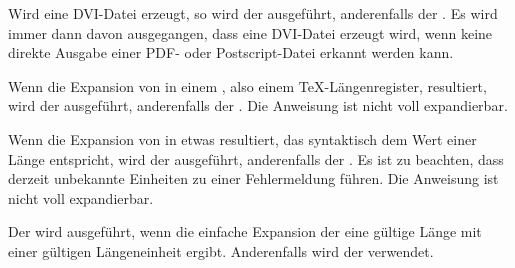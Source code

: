 \begin{Declaration}[0]
\end{Declaration}
Wird eine DVI-Datei erzeugt, so wird der
 ausgeführt, anderenfalls der . Es wird
immer dann davon \iffree{}{\pagebreak}%
ausgegangen, dass eine DVI-Datei erzeugt wird, wenn keine
direkte Ausgabe einer PDF- oder Postscript-Datei erkannt werden kann.%
\EndIndexGroup


\begin{Declaration}
\end{Declaration}
Wenn
die Expansion von  in einem , also einem
\TeX-Längenregister, resultiert, wird der  ausgeführt,
anderenfalls der . Die Anweisung ist nicht voll
expandierbar.%
\iffalse%
\iftrue%
\ Von dieser Anweisung gibt es keine interne Variante.%
\else%
\ Es gibt keine interne Variante.%
\fi%
\fi%
\EndIndexGroup


\begin{Declaration}
\end{Declaration}
Wenn
die Expansion von  in etwas resultiert, das syntaktisch dem Wert
einer Länge entspricht, wird der  ausgeführt, anderenfalls
der . Es ist zu beachten, dass derzeit
unbekannte Einheiten zu einer Fehlermeldung führen. Die Anweisung ist nicht
voll expandierbar.%
\iffalse%
\iftrue%
\ Von dieser Anweisung gibt es keine interne Variante.%
\else%
\ Es gibt keine interne Variante.%
\fi%
\fi%
\EndIndexGroup


\begin{Declaration}
\end{Declaration}
Der
 wird ausgeführt, wenn die einfache Expansion der
 eine gültige Länge mit einer gültigen Längeneinheit
ergibt. Anderenfalls wird der  verwendet.%
\iffalse%
\iftrue%
\ Von dieser Anweisung gibt es keine interne Variante.%
\else%
\ Es gibt keine interne Variante.%
\fi%
\fi%
\EndIndexGroup


